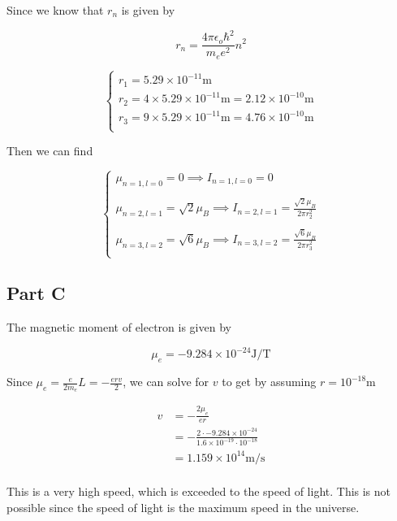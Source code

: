 \documentclass{article}
\begin{document}
Since we know that $r_n$ is given by

\begin{equation}
  r_n = \frac{4\pi \epsilon_{o} \hbar^2}{m_e e^2} n^{2}
\end{equation}

\begin{equation}
  \begin{cases}
    r_1 = 5.29 \times 10^{-11} \text{m} \\
    r_2 = 4 \times 5.29 \times 10^{-11} \text{m} = 2.12 \times 10^{-10} \text{m} \\
    r_3 = 9 \times 5.29 \times 10^{-11} \text{m} = 4.76 \times 10^{-10} \text{m} \\
  \end{cases}
\end{equation}

Then we can find

\begin{equation}
  \begin{cases}
    \displaystyle
    \mu_{n = 1, l = 0} = 0 \implies I_{n =1, l = 0} = 0 \\
    \\
    \displaystyle
    \mu_{n = 2, l = 1} = \sqrt{2} \mu_B \implies I_{n = 2, l = 1} = \frac{\sqrt{2}\mu_B}{2 \pi r_{2}^{2}} \\
    \\
    \displaystyle
    \mu_{n = 3, l = 2} = \sqrt{6} \mu_B \implies I_{n = 3, l = 2} = \frac{\sqrt{6}\mu_B}{2 \pi r_{3}^{2}} \\
  \end{cases}
\end{equation}

\subsection{Part C}

The magnetic moment of electron is given by

\begin{equation}
  \mu_e = - 9.284 \times 10^{-24} \text{J/T}
\end{equation}

Since $\mu_e = \frac{e}{2 m_e}L = - \frac{erv}{2}$, we can solve for $v$ to get by assuming $r = 10^{-18}$m

\begin{align}
  v &= - \frac{2 \mu_e}{er} \\
  &= - \frac{2 \cdot -9.284 \times 10^{-24}}{1.6 \times 10^{-19} \cdot 10^{-18}} \\
  &=  1.159 \times 10^{14} \text{m/s} \\
\end{align}

This is a very high speed, which is exceeded to the speed of light. This is not possible since the speed of light is the maximum speed in the universe.
\end{document}
